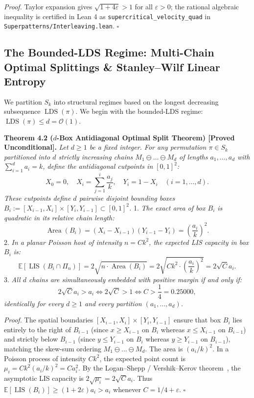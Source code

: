 \documentclass[
  11pt,
]{article}
\begin{document}
\emph{Proof.} Taylor expansion gives \(\sqrt{1+4\varepsilon} > 1\) for all \(\varepsilon > 0\); the rational algebraic inequality is certified in Lean 4 as \texttt{supercritical\_velocity\_quad} in \texttt{Superpatterns/Interleaving.lean}. \(\square\)

\subsection{The Bounded-LDS Regime: Multi-Chain Optimal Splittings \&
Stanley--Wilf Linear
Entropy}\label{the-bounded-lds-regime-multi-chain-optimal-splittings-stanleywilf-linear-entropy}

We partition \(S_k\) into structural regimes based on the longest
decreasing subsequence \(\operatorname{LDS}(\pi)\). We begin with the
bounded-LDS regime: \(\operatorname{LDS}(\pi) \le d = \mathcal{O}(1)\).

\textbf{Theorem 4.2 (\(d\)-Box Antidiagonal Optimal Split Theorem) [Proved Unconditional].}
\emph{Let \(d \ge 1\) be a fixed integer. For any permutation
\(\pi \in S_k\) partitioned into \(d\) strictly increasing chains
\(M_1 \ominus \dots \ominus M_d\) of lengths \(a_1, \dots, a_d\) with
\(\sum_{i=1}^d a_i = k\), define the antidiagonal cutpoints in
\([0, 1]^2\):} \[
X_0 = 0, \quad X_i = \sum_{j=1}^i \frac{a_j}{k}, \quad Y_i = 1 - X_i \quad (i = 1, \dots, d).
\] \emph{These cutpoints define \(d\) pairwise disjoint bounding boxes
\(B_i := [X_{i-1}, X_i] \times [Y_i, Y_{i-1}] \subset [0, 1]^2\).} 1.
\emph{The exact area of box \(B_i\) is quadratic in its relative chain
length:} \[
   \operatorname{Area}(B_i) = (X_i - X_{i-1})(Y_{i-1} - Y_i) = \left(\frac{a_i}{k}\right)^2.
   \] 2. \emph{In a planar Poisson host of intensity \(n = C k^2\), the
expected LIS capacity in box \(B_i\) is:} \[
   \mathbb{E}[\operatorname{LIS}(B_i \cap \Pi_n)] = 2 \sqrt{n \cdot \operatorname{Area}(B_i)} = 2 \sqrt{C k^2 \cdot \left(\frac{a_i}{k}\right)^2} = 2\sqrt{C} a_i.
   \] 3. \emph{All \(d\) chains are simultaneously embedded with
positive margin if and only if:} \[
   2\sqrt{C} a_i > a_i \iff 2\sqrt{C} > 1 \iff C > \frac{1}{4} = 0.25000,
   \] \emph{identically for every \(d \ge 1\) and every partition
\((a_1, \dots, a_d)\).}

\emph{Proof.} The spatial boundaries
\([X_{i-1}, X_i] \times [Y_i, Y_{i-1}]\) ensure that box \(B_i\) lies
entirely to the right of \(B_{i-1}\) (since \(x \ge X_{i-1}\) on \(B_i\)
whereas \(x \le X_{i-1}\) on \(B_{i-1}\)) and strictly below \(B_{i-1}\)
(since \(y \le Y_{i-1}\) on \(B_i\) whereas \(y \ge Y_{i-1}\) on
\(B_{i-1}\)), matching the skew-sum ordering
\(M_1 \ominus \dots \ominus M_d\). The area is \((a_i/k)^2\). In a
Poisson process of intensity \(C k^2\), the expected point count is
\(\mu_i = C k^2 (a_i/k)^2 = C a_i^2\). By the Logan--Shepp /
Vershik--Kerov theorem~\cite{ref-LS77, ref-VK77}, the asymptotic LIS capacity is
\(2\sqrt{\mu_i} = 2\sqrt{C} a_i\). Thus
\(\mathbb{E}[\operatorname{LIS}(B_i)] \ge (1+2\varepsilon)a_i > a_i\)
whenever \(C = 1/4+\varepsilon\). \(\square\)
\end{document}
